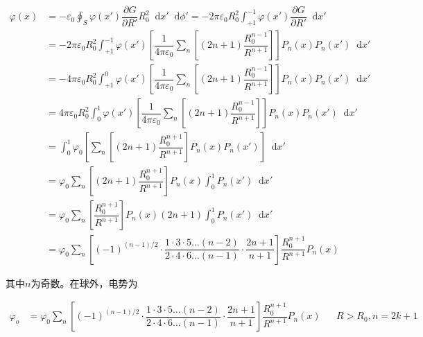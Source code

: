\documentclass{article}
\newcommand*{\md}{\mathop{}\!\mathrm{d}}
\begin{document}
\begin{equation*}
  \begin{aligned}
    \varphi \left( x \right) &= - \varepsilon_0 \oint_S \varphi \left( x' \right) \dfrac{\partial G}{\partial R'} R_0^2 \md x' \md \phi'
    = - 2 \pi \varepsilon_0 R_0^2 \int_{+1}^{-1} \varphi \left( x' \right) \dfrac{\partial G}{\partial R'} \md x' \\
    &= - 2 \pi \varepsilon_0 R_0^2 \int_{+1}^{-1} \varphi \left( x' \right) \left[ \dfrac{1}{4\pi \varepsilon_0} \sum_n \left[ \left( 2n+1 \right) \dfrac{R_0^{n-1} }{R^{n+1}} \right] \right] P_n \left( x \right) P_n \left( x' \right) \md x' \\
    &= - 4 \pi \varepsilon_0 R_0^2 \int_{+1}^0 \varphi \left( x' \right) \left[\dfrac{1}{4\pi \varepsilon_0} \sum_n \left[ \left( 2n+1 \right) \dfrac{R_0^{n-1} }{R^{n+1}} \right]  \right] P_n \left( x \right) P_n \left( x' \right) \md x' \\
    &= 4 \pi \varepsilon_0 R_0^2 \int_0^1 \varphi \left( x' \right) \left[\dfrac{1}{4\pi \varepsilon_0} \sum_n \left[ \left( 2n+1 \right) \dfrac{R_0^{n-1} }{R^{n+1}} \right]  \right] P_n \left( x \right) P_n \left( x' \right) \md x' \\
    &= \int_0^1 \varphi_0  \left[ \sum_n \left[ \left( 2n+1 \right) \dfrac{R_0^{n+1} }{R^{n+1}} \right] P_n \left( x \right) P_n \left( x' \right) \right] \md x' \\
    &= \varphi_0 \sum_n  \left[ \left( 2n+1 \right) \dfrac{R_0^{n+1} }{R^{n+1}} \right] P_n \left( x \right) \int_0^1  P_n \left( x' \right) \md x' \\
    &= \varphi_0 \sum_n  \left[  \dfrac{R_0^{n+1} }{R^{n+1}} \right] P_n \left( x \right) \left( 2n+1 \right) \int_0^1  P_n \left( x' \right) \md x' \\
    &= \varphi_0 \sum_n  \left[ \left( -1  \right)^{\left( n-1 \right)/ 2} \cdot \dfrac{1 \cdot 3 \cdot 5 \dots \left( n-2 \right)}{2 \cdot 4 \cdot 6 \dots \left( n-1 \right)} \cdot \dfrac{2n+1}{n+1} \right] \dfrac{R_0^{n+1} }{R^{n+1}} P_n \left( x \right) 
  \end{aligned}
\end{equation*}

其中$n$为奇数。在球外，电势为

\begin{equation*}
  \begin{aligned}
    \varphi_o &=
    \varphi_0 \sum_n \left[ \left( -1  \right)^{\left( n-1 \right)/ 2} \cdot \dfrac{1 \cdot 3 \cdot 5 \dots \left( n-2 \right)}{2 \cdot 4 \cdot 6 \dots \left( n-1 \right)} \cdot \dfrac{2n+1}{n+1} \right] \dfrac{R_0^{n+1} }{R^{n+1}} P_n \left( x \right) && R>R_0,n=2k+1
  \end{aligned}
\end{equation*}
\end{document}
